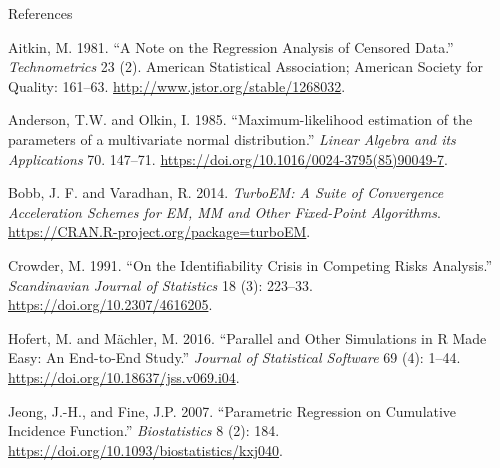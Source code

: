 \documentclass[10pt]{beamer}
\begin{document}
\begin{frame}[allowframebreaks]{References}
\label{References}

Aitkin, M. 1981. ``A Note on the Regression Analysis of Censored Data.''
\emph{Technometrics} 23 (2). American Statistical Association; American
Society for Quality: 161--63. \url{http://www.jstor.org/stable/1268032}.

Anderson, T.W. and Olkin, I. 1985. ``Maximum-likelihood estimation of the parameters of a multivariate normal distribution.''
\emph{Linear Algebra and its Applications} 70.  147--71. \url{https://doi.org/10.1016/0024-3795(85)90049-7}.

Bobb, J. F. and Varadhan, R. 2014. \emph{TurboEM: A Suite of
Convergence Acceleration Schemes for EM, MM and Other Fixed-Point
Algorithms}. \url{https://CRAN.R-project.org/package=turboEM}.

Crowder, M. 1991. ``On the Identifiability Crisis in Competing Risks
Analysis.'' \emph{Scandinavian Journal of Statistics}
18 (3): 223--33. \url{https://doi.org/10.2307/4616205}.

Hofert, M. and  Mächler, M. 2016. ``Parallel and Other
Simulations in R Made Easy: An End-to-End Study.'' \emph{Journal of
Statistical Software} 69 (4): 1--44.
\url{https://doi.org/10.18637/jss.v069.i04}.

Jeong, J.-H., and Fine, J.P. 2007. ``Parametric Regression on
Cumulative Incidence Function.'' \emph{Biostatistics} 8 (2): 184.
\url{https://doi.org/10.1093/biostatistics/kxj040}.

\end{frame}


\end{document}
